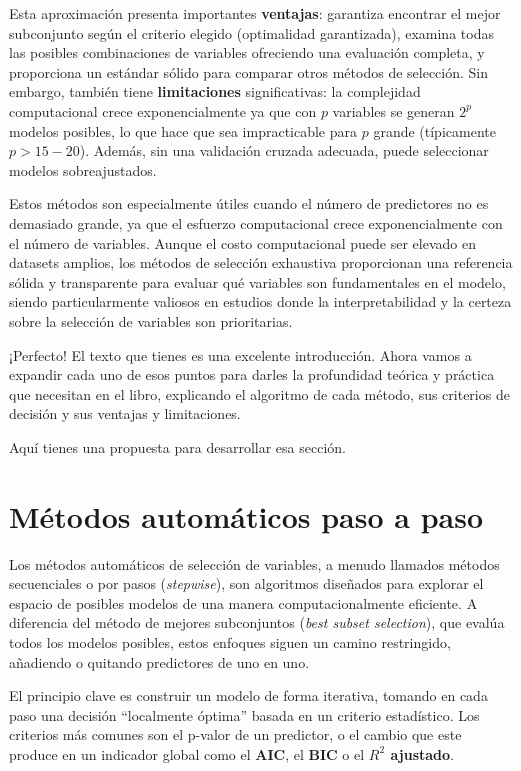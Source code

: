 \documentclass[
  letterpaper,
  DIV=11,
  numbers=noendperiod]{scrreprt}
\begin{document}
Esta aproximación presenta importantes \textbf{ventajas}: garantiza
encontrar el mejor subconjunto según el criterio elegido (optimalidad
garantizada), examina todas las posibles combinaciones de variables
ofreciendo una evaluación completa, y proporciona un estándar sólido
para comparar otros métodos de selección. Sin embargo, también tiene
\textbf{limitaciones} significativas: la complejidad computacional crece
exponencialmente ya que con \(p\) variables se generan \(2^p\) modelos
posibles, lo que hace que sea impracticable para \(p\) grande
(típicamente \(p > 15-20\)). Además, sin una validación cruzada
adecuada, puede seleccionar modelos sobreajustados.

Estos métodos son especialmente útiles cuando el número de predictores
no es demasiado grande, ya que el esfuerzo computacional crece
exponencialmente con el número de variables. Aunque el costo
computacional puede ser elevado en datasets amplios, los métodos de
selección exhaustiva proporcionan una referencia sólida y transparente
para evaluar qué variables son fundamentales en el modelo, siendo
particularmente valiosos en estudios donde la interpretabilidad y la
certeza sobre la selección de variables son prioritarias.

¡Perfecto! El texto que tienes es una excelente introducción. Ahora
vamos a expandir cada uno de esos puntos para darles la profundidad
teórica y práctica que necesitan en el libro, explicando el algoritmo de
cada método, sus criterios de decisión y sus ventajas y limitaciones.

Aquí tienes una propuesta para desarrollar esa sección.

\section{Métodos automáticos paso a
paso}\label{muxe9todos-automuxe1ticos-paso-a-paso}

Los métodos automáticos de selección de variables, a menudo llamados
métodos secuenciales o por pasos (\emph{stepwise}), son algoritmos
diseñados para explorar el espacio de posibles modelos de una manera
computacionalmente eficiente. A diferencia del método de mejores
subconjuntos (\emph{best subset selection}), que evalúa todos los
modelos posibles, estos enfoques siguen un camino restringido, añadiendo
o quitando predictores de uno en uno.

El principio clave es construir un modelo de forma iterativa, tomando en
cada paso una decisión ``localmente óptima'' basada en un criterio
estadístico. Los criterios más comunes son el p-valor de un predictor, o
el cambio que este produce en un indicador global como el \textbf{AIC},
el \textbf{BIC} o el \textbf{\(R^2\) ajustado}.
\end{document}
